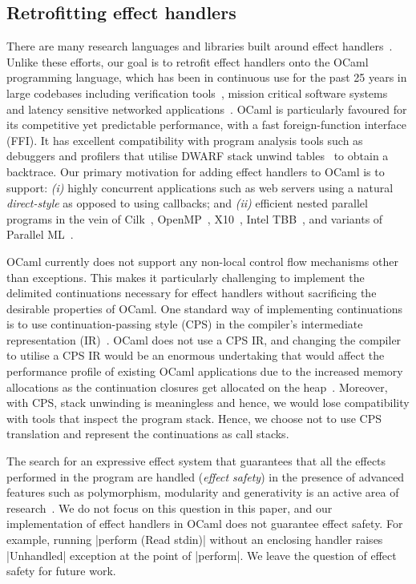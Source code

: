 \documentclass[sigplan,screen]{acmart}
\begin{document}
\subsection{Retrofitting effect handlers}

There are many research languages and libraries built around effect
handlers~\cite{Leijen14,Hillerstrom20,Pyro,Frank,Eff}. Unlike these efforts,
our goal is to retrofit effect handlers onto the OCaml programming language,
which has been in continuous use for the past 25 years in large codebases
including verification tools~\cite{everest,Coq}, mission critical software
systems~\cite{astree} and latency sensitive networked
applications~\cite{Madhavapeddy13}. OCaml is particularly favoured for its
competitive yet predictable performance, with a fast foreign-function interface
(FFI). It has excellent compatibility with program analysis tools such as
debuggers and profilers that utilise DWARF stack unwind tables~\cite{DWARF} to
obtain a backtrace. Our primary motivation for adding effect handlers to OCaml
is to support: {\em (i)} highly concurrent applications such as web servers
using a natural \emph{direct-style} as opposed to using callbacks; and {\em
(ii)} efficient nested parallel programs in the vein of Cilk~\cite{Cilk},
OpenMP~\cite{OpenMP}, X10~\cite{Charles05}, Intel TBB~\cite{IntelTBB}, and
variants of Parallel ML~\cite{MaPLe, Fluet10, Sivaramakrishnan14}.

OCaml currently does not support any non-local control flow mechanisms other
than exceptions. This makes it particularly challenging to implement the
delimited continuations necessary for effect handlers without sacrificing the
desirable properties of OCaml. One standard way of implementing continuations
is to use continuation-passing style (CPS) in the compiler's intermediate
representation (IR)~\cite{Leijen14}. OCaml does not use a CPS IR, and changing
the compiler to utilise a CPS IR would be an enormous undertaking that would
affect the performance profile of existing OCaml applications due to the
increased memory allocations as the continuation closures get allocated on the
heap~\cite{Farvardin20}. Moreover, with CPS, stack unwinding is meaningless and
hence, we would lose compatibility with tools that inspect the program stack.
Hence, we choose not to use CPS translation and represent the continuations as
call stacks.

The search for an expressive effect system that guarantees that all the effects
performed in the program are handled (\emph{effect safety}) in the presence of
advanced features such as polymorphism, modularity and generativity is an
active area of research~\cite{Leijen14, Biernacki19, Biernacki20,
Hillerstrom20}. We do not focus on this question in this paper, and our
implementation of effect handlers in OCaml does not guarantee effect safety.
For example, running |perform (Read stdin)| without an enclosing handler raises
|Unhandled| exception at the point of |perform|. We leave the question of
effect safety for future work.
\end{document}
